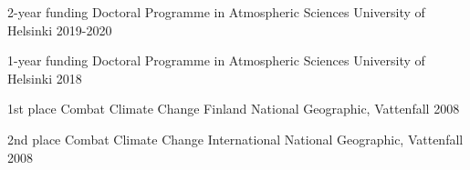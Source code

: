 



\begin{cvhonors}
	
  \cvhonor
    {2-year funding} %
    {Doctoral Programme in Atmospheric Sciences} %
    {University of Helsinki} %
    {2019-2020} %
    
	
  \cvhonor
    {1-year funding} %
    {Doctoral Programme in Atmospheric Sciences} %
    {University of Helsinki} %
    {2018} %

  \cvhonor
    {1st place} %
    {Combat Climate Change Finland} %
    {National Geographic, Vattenfall} %
    {2008} %

  \cvhonor
    {2nd place} %
    {Combat Climate Change International} %
    {National Geographic, Vattenfall} %
    {2008} %


\end{cvhonors}




\begin{cvhonors}




\end{cvhonors}
